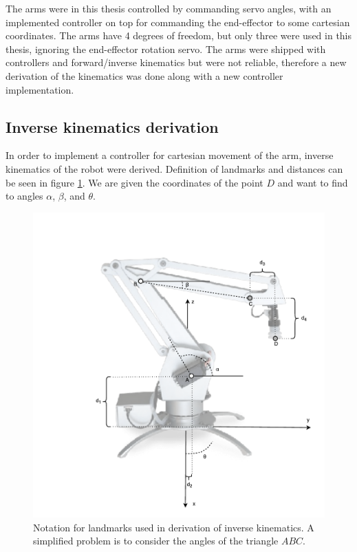 The arms were in this thesis controlled by commanding servo angles, with an
implemented controller on top for commanding the end-effector to some cartesian
coordinates. The arms have 4 degrees of freedom, but only three were used in
this thesis, ignoring the end-effector rotation servo. The arms were shipped
with controllers and forward/inverse kinematics but were not reliable,
therefore a new derivation of the kinematics was done along with a new
controller implementation.

\subsection{Inverse kinematics derivation}

In order to implement a controller for cartesian movement of the arm, inverse
kinematics of the robot were derived. Definition of landmarks and distances can
be seen in figure \ref{fig:uarm_landmarks}. We are given the coordinates of the
point $D$ and want to find to angles $\alpha$, $\beta$, and $\theta$.

\begin{figure}[!ht]
    \centering
    \includegraphics[width=0.80 \textwidth]{res/inverse_kinematics.pdf}

    \caption{Notation for landmarks used in derivation of inverse kinematics. A
    simplified problem is to consider the angles of the triangle $ABC$.}

    \label{fig:uarm_landmarks}

\end{figure}

